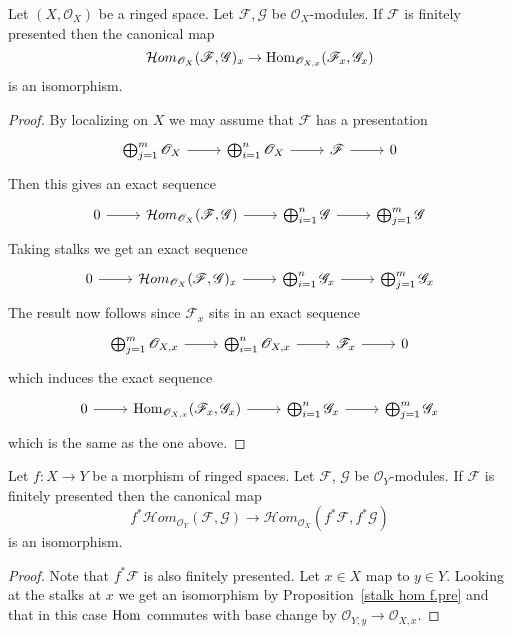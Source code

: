 \begin{proposition}\label{stalk hom f.pre}
Let $(X,\mathscr{O}_X)$ be a ringed space. Let $\mathscr{F},\mathscr{G}$ be $\mathscr{O}_X$-modules. If $\mathscr{F}$ is finitely presented then the canonical map
\[\mathcal{H}om_{\mathscr{O}_X}(\mathscr{F},\mathscr{G})_x\to \mathrm{Hom}_{\mathscr{O}_{X,x}}(\mathscr{F}_x,\mathscr{G}_x)\]
is an isomorphism.
\end{proposition}
\begin{proof}
By localizing on $X$ we may assume that $\mathscr{F}$ has a presentation
\[\begin{tikzcd}
\bigoplus_{j=1}^{m}\mathscr{O}_X\ar[r]&\bigoplus_{i=1}^{n}\mathscr{O}_X\ar[r]&\mathscr{F}\ar[r]&0
\end{tikzcd}\]
Then this gives an exact sequence
\[\begin{tikzcd}
0\ar[r]&\mathcal{H}om_{\mathscr{O}_X}(\mathscr{F},\mathscr{G})\ar[r]&\bigoplus_{i=1}^{n}\mathscr{G}\ar[r]&\bigoplus_{j=1}^{m}\mathscr{G}
\end{tikzcd}\]
Taking stalks we get an exact sequence
\[\begin{tikzcd}
0\ar[r]&\mathcal{H}om_{\mathscr{O}_X}(\mathscr{F},\mathscr{G})_x\ar[r]&\bigoplus_{i=1}^{n}\mathscr{G}_x\ar[r]&\bigoplus_{j=1}^{m}\mathscr{G}_x
\end{tikzcd}\]
The result now follows since $\mathscr{F}_x$ sits in an exact sequence
\[\begin{tikzcd}
\bigoplus_{j=1}^{m}\mathscr{O}_{X,x}\ar[r]&\bigoplus_{i=1}^{n}\mathscr{O}_{X,x}\ar[r]&\mathscr{F}_x\ar[r]&0
\end{tikzcd}\]
which induces the exact sequence
\[\begin{tikzcd}
0\ar[r]&\Hom_{\mathscr{O}_{X,x}}(\mathscr{F}_x,\mathscr{G}_x)\ar[r]&\bigoplus_{i=1}^{n}\mathscr{G}_x\ar[r]&\bigoplus_{j=1}^{m}\mathscr{G}_x
\end{tikzcd}\]
which is the
same as the one above.
\end{proof}
\begin{proposition}\label{pull back hom f.pre}
Let $f:X\to Y$ be a morphism of ringed spaces. Let $\mathscr{F}$, $\mathscr{G}$ be $\mathscr{O}_Y$-modules. If $\mathscr{F}$ is finitely presented then the canonical map
\[f^*\mathcal{H}om_{\mathscr{O}_Y}(\mathscr{F},\mathscr{G})\to\mathcal{H}om_{\mathscr{O}_X}(f^*\mathscr{F},f^*\mathscr{G})\]
is an isomorphism.
\end{proposition}
\begin{proof}
Note that $f^*\mathscr{F}$ is also finitely presented. Let $x\in X$ map
to $y\in Y$. Looking at the stalks at $x$ we get an isomorphism by Proposition~\ref{stalk hom f.pre} and that in this case $\mathrm{Hom}$ commutes with base change by $\mathscr{O}_{Y,y}\to\mathscr{O}_{X,x}$.
\end{proof}
